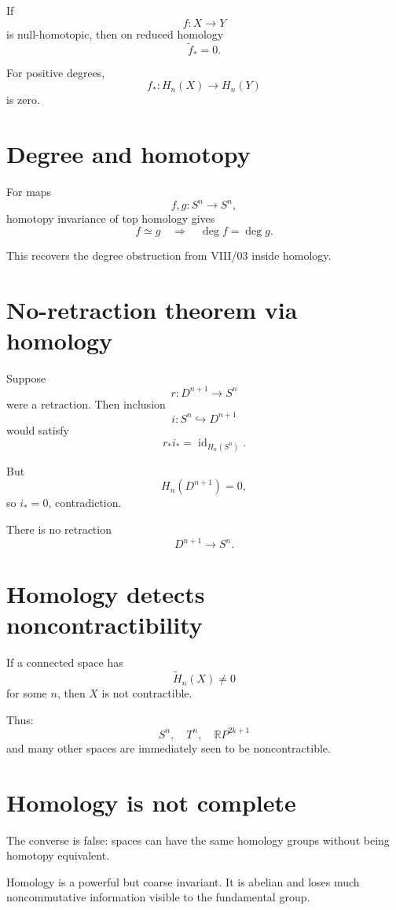 If
\[
f:X\to Y
\]
is null-homotopic, then on reduced homology
\[
\widetilde f_*=0.
\]

For positive degrees,
\[
f_*:H_n(X)\to H_n(Y)
\]
is zero.

\section{Degree and homotopy}

For maps
\[
f,g:S^n\to S^n,
\]
homotopy invariance of top homology gives
\[
f\simeq g
\quad\Longrightarrow\quad
\deg f=\deg g.
\]

This recovers the degree obstruction from VIII/03 inside homology.

\section{No-retraction theorem via homology}

Suppose
\[
r:D^{n+1}\to S^n
\]
were a retraction.  Then inclusion
\[
i:S^n\hookrightarrow D^{n+1}
\]
would satisfy
\[
r_*i_*=\operatorname{id}_{H_n(S^n)}.
\]

But
\[
H_n(D^{n+1})=0,
\]
so \(i_*=0\), contradiction.

\begin{theorem}
\label{thm:viii20-no-retraction}
There is no retraction
\[
D^{n+1}\to S^n.
\]
\end{theorem}

\section{Homology detects noncontractibility}

If a connected space has
\[
\widetilde H_n(X)\ne0
\]
for some \(n\), then \(X\) is not contractible.

Thus:
\[
S^n,\quad T^n,\quad \mathbb RP^{2k+1}
\]
and many other spaces are immediately seen to be noncontractible.

\section{Homology is not complete}

The converse is false: spaces can have the same homology groups without being
homotopy equivalent.

Homology is a powerful but coarse invariant.  It is abelian and loses much
noncommutative information visible to the fundamental group.

